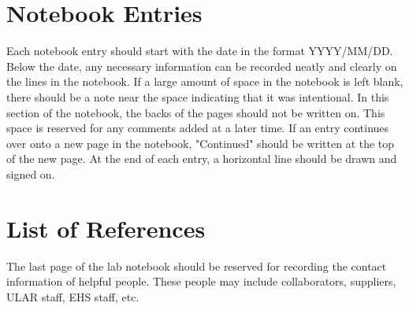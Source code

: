 \documentclass[11pt, oneside]{article}   	%
\begin{document}

\section{Notebook Entries}

Each notebook entry should start with the date in the format YYYY/MM/DD. Below the date, any necessary information can be recorded neatly and clearly on the lines in the notebook. If a large amount of space in the notebook is left blank, there should be a note near the space indicating that it was intentional. In this section of the notebook, the backs of the pages should not be written on. This space is reserved for any comments added at a later time. If an entry continues over onto a new page in the notebook, "Continued" should be written at the top of the new page. At the end of each entry, a horizontal line should be drawn and signed on. 


\section{List of References}

The last page of the lab notebook should be reserved for recording the contact information of helpful people. These people may include collaborators, suppliers, ULAR staff, EHS staff, etc.


\end{document}
